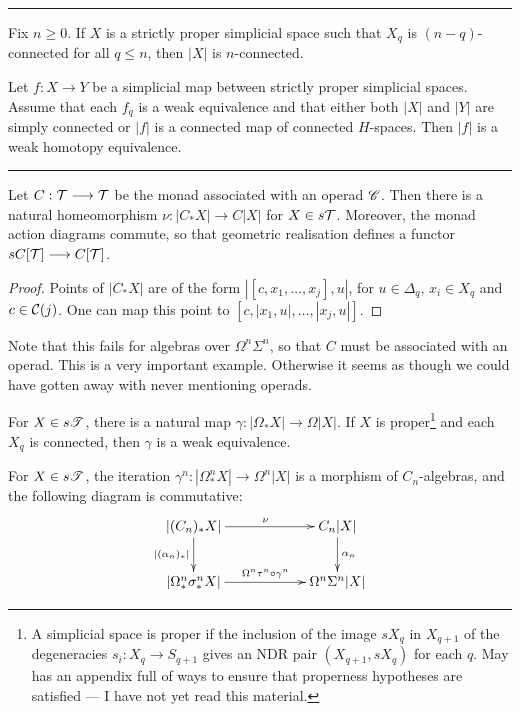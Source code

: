 \documentclass[11pt]{article}
\begin{document}
\begin{Operads}
\hrule

\begin{thm*}[11.12]
Fix $n\geq0$. If $X$ is a strictly proper simplicial space such that $X_q$ is $(n-q)$-connected for all $q\leq n$, then $|X|$ is $n$-connected.
\end{thm*}
\begin{thm*}[11.13]
Let $f:X\to Y$ be a simplicial map between strictly proper simplicial spaces. Assume that each $f_q$ is a weak equivalence and that either both $|X|$ and $|Y|$ are simply connected or $|f|$ is a connected map of connected $H$-spaces. Then $|f|$ is a weak homotopy equivalence.
\end{thm*}
\hrule
\begin{thm*}[12.2]
Let $C:\mathcal{T}\longrightarrow\mathcal{T}$ be the monad associated with an operad $\mathscr{C}$. Then there is a natural homeomorphism $\nu:|C_*X|\to C|X|$ for $X\in s\mathcal{T}$. Moreover, the monad action diagrams commute, so that geometric realisation defines a functor $sC[\mathcal{T}]\longrightarrow C[\mathcal{T}]$.
\end{thm*}
\begin{proof}
Points of $|C_*X|$ are of the form $|[c,x_1,\ldots,x_j],u|$, for $u\in\Delta_q$, $x_i\in X_q$ and $c\in\mathcal{C}(j)$. One can map this point to $[c,|x_1,u|,\ldots,|x_j,u|]$.
\end{proof}
\noindent Note that this fails for algebras over $\Omega^n\Sigma^n$, so that $C$ must be associated with an operad. This is a very important example. Otherwise it seems as though we could have gotten away with never mentioning operads.
\begin{thm*}[12.3]
For $X\in s\mathscr{T}$, there is a natural map $\gamma:|\Omega_*X|\to\Omega|X|$. If $X$ is proper\footnote{A simplicial space is proper if the inclusion of the image $sX_q$ in $X_{q+1}$ of the degeneracies $s_i:X_q\to S_{q+1}$ gives an NDR pair $(X_{q+1},sX_q)$ for each $q$. May has an appendix full of ways to ensure that properness hypotheses are satisfied --- I have not yet read this material.} and each $X_q$ is connected, then $\gamma$ is a weak equivalence.
\end{thm*}
\begin{thm*}[12.4]
For $X\in s\mathscr{T}$, the iteration $\gamma^n:|\Omega^n_*X|\to\Omega^n|X|$ is a morphism of $C_n$-algebras, and the following diagram is commutative:
\[\xymatrix@C=2cm{
|(C_n)_*X|\ar[r]^{\nu}\ar[d]_{|(\alpha_n)_*|}&C_n|X|\ar[d]^{\alpha_n}\\
|\Omega^n_*\sigma^n_*X|\ar[r]^{\Omega^n\tau^n \circ\gamma^n}&\Omega^n\Sigma^n|X|
}\]
\end{thm*}

\pagebreak

\end{Operads}
\end{document}
